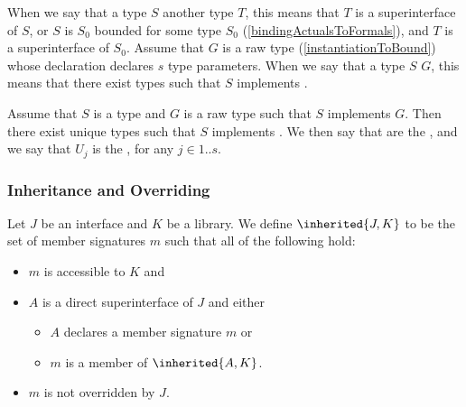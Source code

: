 \documentclass[makeidx]{article}
\begin{document}
\LMHash{}%
When we say that a type $S$
another type $T$,
this means that $T$ is a superinterface of $S$,
or $S$ is $S_0$ bounded for some type $S_0$
(\ref{bindingActualsToFormals}),
and $T$ is a superinterface of $S_0$.
Assume that $G$ is a raw type
(\ref{instantiationToBound})
whose declaration declares $s$ type parameters.
When we say that a type $S$
$G$,
this means that there exist types 
such that $S$ implements .


\LMHash{}%
Assume that $S$ is a type and $G$ is a raw type such that $S$ implements $G$.
Then there exist unique types  such that
$S$ implements .
We then say that  are the
,
and we say that $U_j$ is the
,
for any $j \in 1 .. s$.



\subsubsection{Inheritance and Overriding}

\LMHash{}%
Let $J$ be an interface and $K$ be a library.
We define $\inherited{J, K}$ to be the set of member signatures $m$
such that all of the following hold:
\begin{itemize}
\item $m$ is accessible to $K$ and
\item $A$ is a direct superinterface of $J$ and either
  \begin{itemize}
  \item $A$ declares a member signature $m$ or
  \item $m$ is a member of $\inherited{A, K}$.
  \end{itemize}
\item $m$ is not overridden by $J$.
\end{itemize}
\end{document}
